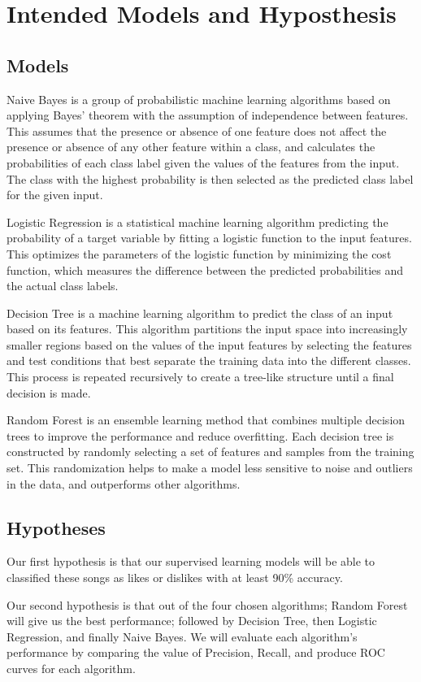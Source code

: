 \section*{Intended Models and Hyposthesis}

\subsection*{Models}
Naive Bayes is a group of probabilistic machine learning
algorithms based on applying Bayes' theorem with the assumption of independence between features. This assumes
that the presence or absence of one feature does not affect
the presence or absence of any other feature within a class,
and calculates the probabilities of each class label given the
values of the features from the input. The class with the
highest probability is then selected as the predicted class
label for the given input.

Logistic Regression is a statistical machine learning algorithm predicting the probability of a target variable by
fitting a logistic function to the input features. This optimizes the parameters of the logistic function by minimizing
the cost function, which measures the difference between
the predicted probabilities and the actual class labels.

Decision Tree is a machine learning algorithm to predict
the class of an input based on its features. This algorithm
partitions the input space into increasingly smaller regions
based on the values of the input features by selecting the
features and test conditions that best separate the training
data into the different classes. This process is repeated
recursively to create a tree-like structure until a final decision
is made.

Random Forest is an ensemble learning method that combines multiple decision trees to improve the performance
and reduce overfitting. Each decision tree is constructed by
randomly selecting a set of features and samples from the
training set. This randomization helps to make a model less
sensitive to noise and outliers in the data, and outperforms
other algorithms.

\subsection*{Hypotheses}
Our first hypothesis is that our supervised learning models
will be able to classified these songs as likes or dislikes with
at least 90\% accuracy.

Our second hypothesis is that out of the four chosen algorithms; Random Forest will give us the best performance;
followed by Decision Tree, then Logistic Regression, and
finally Naive Bayes. We will evaluate each algorithm's performance by comparing the value of Precision, Recall, and
produce ROC curves for each algorithm.